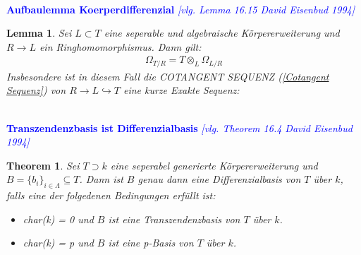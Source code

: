 \documentclass[10pt,a4paper]{report}
\newcommand{\comment}[1]{}
\newcommand{\ModulsOfDifferenzials}{David Eisenbud 1994}
\newcounter{Aussage}[chapter]
\newtheorem{theorem}[Aussage]{Theorem}
\newtheorem{lemma}[Aussage]{Lemma}
\newcommand{\divR}[2]{\Omega_{#1/#2}}
\newcommand{\Tensor}[3]{#1 \otimes_{#2} #3}
\begin{document}
\ \\
\textcolor{blue}{\textbf{Aufbaulemma Koerperdifferenzial} \textit{[vlg. Lemma 16.15 \ModulsOfDifferenzials]}}
\begin{lemma}\label{Aufbaulemma Koerperdifferenzial}
Sei $L \subset T$ eine seperable und algebraische Körpererweiterung und $R \longrightarrow L$ ein Ringhomomorphismus. Dann gilt:
\begin{gather*}
\divR{T}{R} = \Tensor{T}{L}{\divR{L}{R}}
\end{gather*}
Insbesondere ist in diesem Fall die COTANGENT SEQUENZ \textit{(\cref{Cotangent Sequenz})} von $R \rightarrow L \hookrightarrow T$ eine kurze Exakte Sequenz:
\begin{center}
\end{center}
\end{lemma}


\ \\
\textcolor{blue}{\textbf{Transzendenzbasis ist Differenzialbasis} \textit{[vlg. Theorem 16.4 \ModulsOfDifferenzials]}}
\begin{theorem}\comment{\label{Transzendenzbasis ist Differenzialbasis}}
Sei $T \supset k$ eine seperabel generierte Körpererweiterung und $B = \lbrace b_i \rbrace_{i \in \Lambda} \subseteq T$. Dann ist $B$ genau dann eine Differenzialbasis von $T$ über $k$, falls eine der folgedenen Bedingungen erfüllt ist:
\begin{itemize}
\item[\textbf{1.}] char(k) = 0 und $B$ ist eine Transzendenzbasis von $T$ über $k$.
\item[\textbf{2.}] char(k) = p und $B$ ist eine p-Basis von $T$ über $k$.
\end{itemize}
\end{theorem}
\end{document}
